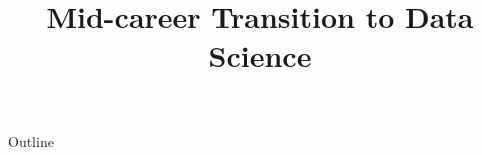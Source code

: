 \documentclass[xcolor=dvipsnames,compress,t,pdf,9pt]{beamer}
\title[\insertframenumber /\inserttotalframenumber]{Mid-career Transition to Data Science}
\begin{document}
	\begin{frame}
	\titlepage
	\end{frame}
	
	\begin{frame}{Outline}
	    \tableofcontents
	\end{frame}

	
	

	
\end{document}
